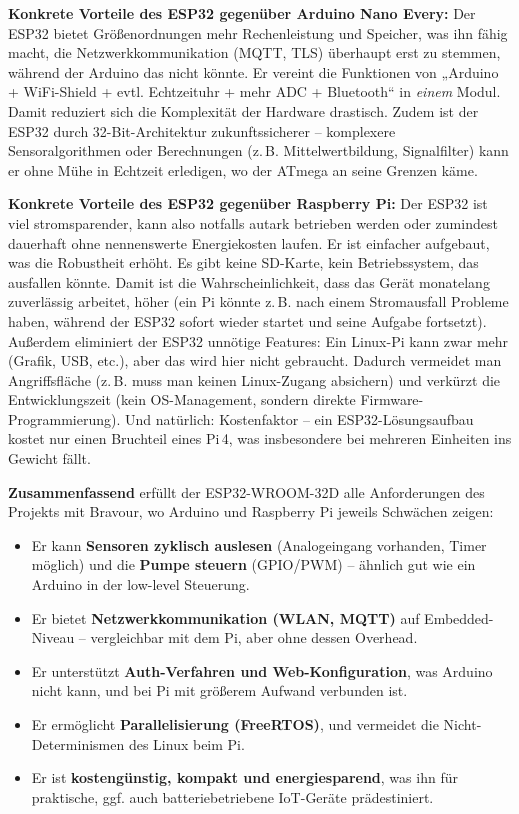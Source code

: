 \noindent\textbf{Konkrete Vorteile des ESP32 gegenüber Arduino Nano Every:} Der ESP32 bietet Größenordnungen mehr Rechenleistung und Speicher, was ihn fähig macht, die Netzwerkkommunikation (MQTT, TLS) überhaupt erst zu stemmen, während der Arduino das nicht könnte. Er vereint die Funktionen von „Arduino + WiFi-Shield + evtl. Echtzeituhr + mehr ADC + Bluetooth“ in \emph{einem} Modul. Damit reduziert sich die Komplexität der Hardware drastisch. Zudem ist der ESP32 durch 32-Bit-Architektur zukunftssicherer – komplexere Sensoralgorithmen oder Berechnungen (z.\,B. Mittelwertbildung, Signalfilter) kann er ohne Mühe in Echtzeit erledigen, wo der ATmega an seine Grenzen käme.


\vspace{5mm}

\noindent\textbf{Konkrete Vorteile des ESP32 gegenüber Raspberry Pi:} Der ESP32 ist viel stromsparender, kann also notfalls autark betrieben werden oder zumindest dauerhaft ohne nennenswerte Energiekosten laufen. Er ist einfacher aufgebaut, was die Robustheit erhöht. Es gibt keine SD-Karte, kein Betriebssystem, das ausfallen könnte. Damit ist die Wahrscheinlichkeit, dass das Gerät monatelang zuverlässig arbeitet, höher (ein Pi könnte z.\,B. nach einem Stromausfall Probleme haben, während der ESP32 sofort wieder startet und seine Aufgabe fortsetzt). Außerdem eliminiert der ESP32 unnötige Features: Ein Linux-Pi kann zwar mehr (Grafik, USB, etc.), aber das wird hier nicht gebraucht. Dadurch vermeidet man Angriffsfläche (z.\,B. muss man keinen Linux-Zugang absichern) und verkürzt die Entwicklungszeit (kein OS-Management, sondern direkte Firmware-Programmierung). Und natürlich: Kostenfaktor – ein ESP32-Lösungsaufbau kostet nur einen Bruchteil eines Pi\,4, was insbesondere bei mehreren Einheiten ins Gewicht fällt.


\vspace{5mm}

\noindent\textbf{Zusammenfassend} erfüllt der ESP32-WROOM-32D alle Anforderungen des Projekts mit Bravour, wo Arduino und Raspberry Pi jeweils Schwächen zeigen:

\begin{itemize}[leftmargin=*]
    \item Er kann \textbf{Sensoren zyklisch auslesen} (Analogeingang vorhanden, Timer möglich) und die \textbf{Pumpe steuern} (GPIO/PWM) – ähnlich gut wie ein Arduino in der low-level Steuerung.
    \item Er bietet \textbf{Netzwerkkommunikation (WLAN, MQTT)} auf Embedded-Niveau – vergleichbar mit dem Pi, aber ohne dessen Overhead.
    \item Er unterstützt \textbf{Auth-Verfahren und Web-Konfiguration}, was Arduino nicht kann, und bei Pi mit größerem Aufwand verbunden ist.
    \item Er ermöglicht \textbf{Parallelisierung (FreeRTOS)}, und vermeidet die Nicht-Determinismen des Linux beim Pi.
    \item Er ist \textbf{kostengünstig, kompakt und energiesparend}, was ihn für praktische, ggf. auch batteriebetriebene IoT-Geräte prädestiniert.
\end{itemize}

